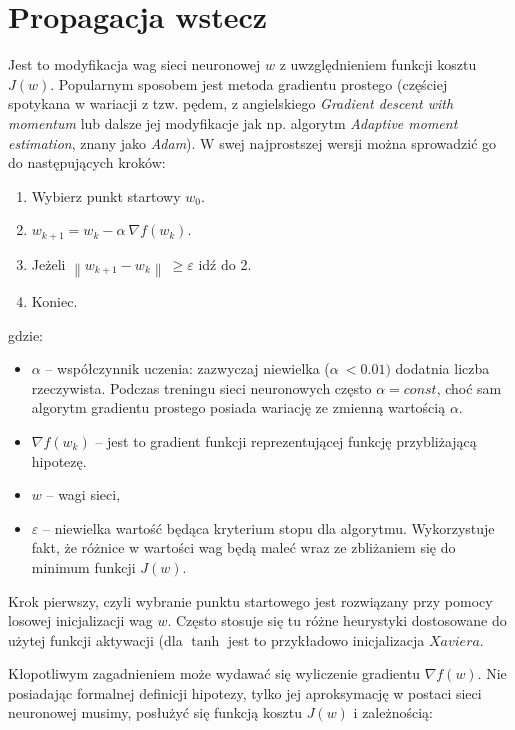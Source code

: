 \section{Propagacja wstecz}
\label{sec:backprob}

Jest to modyfikacja wag sieci neuronowej \(w\) z uwzględnieniem funkcji kosztu \(J(w)\). Popularnym sposobem jest metoda gradientu prostego (częściej spotykana w wariacji z tzw. pędem, z angielskiego \textit{Gradient descent with momentum} lub dalsze jej modyfikacje jak np. algorytm
\textit{Adaptive moment estimation}, znany jako \textit{Adam}). W swej najprostszej wersji można sprowadzić go do następujących kroków:

\begin{enumerate}
\def\labelenumi{\arabic{enumi}.}
\item
  Wybierz punkt startowy \(w_{0}\).
\item
  \(w_{k + 1} = w_{k} - \alpha\ \nabla f(w_{k})\).
\item
  Jeżeli \(\left\| w_{k + 1} - w_{k} \right\|\  \geq \varepsilon\) idź
  do 2.
\item
  Koniec.
\end{enumerate}

gdzie:

\begin{itemize}
\item
  \(\alpha\) -- współczynnik uczenia: zazwyczaj niewielka
  (\(\alpha\  < 0.01)\) dodatnia liczba rzeczywista. Podczas treningu
  sieci neuronowych często \(\alpha = const\), choć sam algorytm
  gradientu prostego posiada wariację ze zmienną wartością \(\alpha\).
\item
  \(\nabla f(w_{k})\) -- jest to gradient funkcji reprezentującej
  funkcję przybliżającą hipotezę.
\item
  \(w\) -- wagi sieci,
\item
  \(\varepsilon\) -- niewielka wartość będąca kryterium stopu dla
  algorytmu. Wykorzystuje fakt, że różnice w wartości wag będą maleć
  wraz ze zbliżaniem się do minimum funkcji \(J(w)\).
\end{itemize}

Krok pierwszy, czyli wybranie punktu startowego jest rozwiązany przy pomocy losowej inicjalizacji wag \(w\). Często stosuje się tu różne heurystyki dostosowane do użytej funkcji aktywacji (dla \(\tanh\) jest to przykładowo inicjalizacja \(Xaviera\).

Kłopotliwym zagadnieniem może wydawać się wyliczenie gradientu \(\nabla f(w)\). Nie posiadając formalnej definicji hipotezy, tylko jej aproksymację w postaci sieci neuronowej musimy, posłużyć się funkcją kosztu \(J(w)\) i zależnością:

